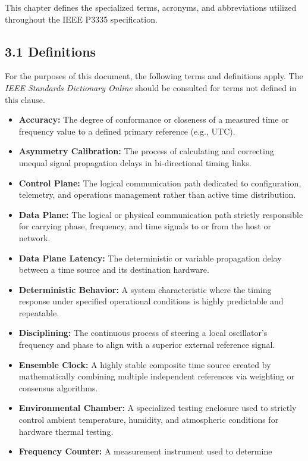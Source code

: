 \documentclass[
]{article}
\begin{document}
This chapter defines the specialized terms, acronyms, and abbreviations
utilized throughout the IEEE P3335 specification.

\subsection{3.1 Definitions}\label{definitions}

For the purposes of this document, the following terms and definitions
apply. The \emph{IEEE Standards Dictionary Online} should be consulted
for terms not defined in this clause.

\begin{itemize}
\item
  \textbf{Accuracy:} The degree of conformance or closeness of a
  measured time or frequency value to a defined primary reference (e.g.,
  UTC).
\item
  \textbf{Asymmetry Calibration:} The process of calculating and
  correcting unequal signal propagation delays in bi-directional timing
  links.
\item
  \textbf{Control Plane:} The logical communication path dedicated to
  configuration, telemetry, and operations management rather than active
  time distribution.
\item
  \textbf{Data Plane:} The logical or physical communication path
  strictly responsible for carrying phase, frequency, and time signals
  to or from the host or network.
\item
  \textbf{Data Plane Latency:} The deterministic or variable propagation
  delay between a time source and its destination hardware.
\item
  \textbf{Deterministic Behavior:} A system characteristic where the
  timing response under specified operational conditions is highly
  predictable and repeatable.
\item
  \textbf{Disciplining:} The continuous process of steering a local
  oscillator's frequency and phase to align with a superior external
  reference signal.
\item
  \textbf{Ensemble Clock:} A highly stable composite time source created
  by mathematically combining multiple independent references via
  weighting or consensus algorithms.
\item
  \textbf{Environmental Chamber:} A specialized testing enclosure used
  to strictly control ambient temperature, humidity, and atmospheric
  conditions for hardware thermal testing.
\item
  \textbf{Frequency Counter:} A measurement instrument used to determine

\end{itemize}
\end{document}
